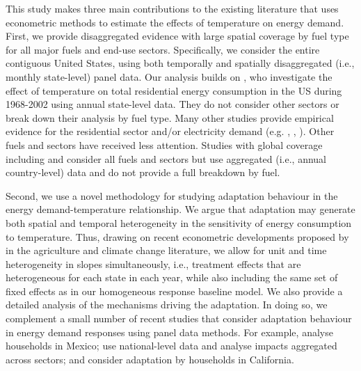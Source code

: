 \documentclass[11pt]{article}
\begin{document}
This study makes three main contributions to the existing literature that uses econometric methods to estimate the effects of temperature on energy demand. First, we provide disaggregated evidence with large spatial coverage by fuel type for all major fuels and end-use sectors. Specifically, we consider the entire contiguous United States, using both temporally and spatially disaggregated (i.e., monthly state-level) panel data. Our analysis builds on \cite{Green2011}, who investigate the effect of temperature on total residential energy consumption in the US during 1968-2002 using annual state-level data. They do not consider other sectors or break down their analysis by fuel type. 
Many other studies provide empirical evidence for the residential sector and/or electricity demand (e.g. \cite{Davis5962}, \cite{Auffhammer1886}, \cite{auffhammer2022climate}). Other fuels and sectors have received less attention. Studies with global coverage including \cite{DeCian2019} and \cite{Rode2021} consider all fuels and sectors but use aggregated (i.e., annual country-level) data and do not provide a full breakdown by fuel.

Second, we use a novel methodology for studying adaptation behaviour in the energy demand-temperature relationship. We argue that adaptation may generate both spatial and temporal heterogeneity in the sensitivity of energy consumption to temperature. Thus, drawing on recent econometric developments proposed by \cite{keane2020climate} in the agriculture and climate change literature, we allow for unit and time heterogeneity in slopes simultaneously, i.e., treatment effects that are heterogeneous for each state in each year, while also including the same set of fixed effects as in our homogeneous response baseline model. We also provide a detailed analysis of the mechanisms driving the adaptation. In doing so, we complement a small number of recent studies that consider adaptation behaviour in energy demand responses using panel data methods. For example, \cite{Davis5962} analyse households in Mexico; \cite{Rode2021} use national-level data and analyse impacts aggregated across sectors; and \cite{auffhammer2022climate} consider adaptation by households in California. %
\end{document}

